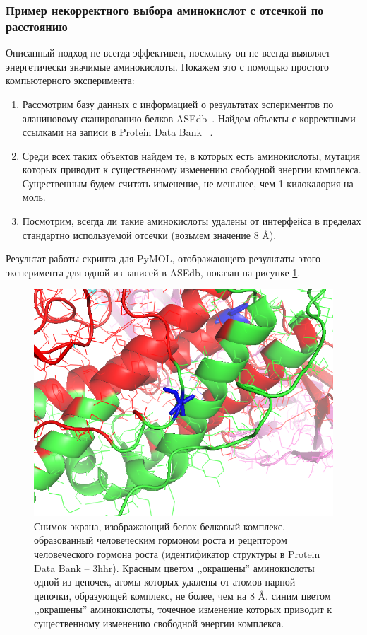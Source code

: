 \subsubsection{Пример некорректного выбора аминокислот с отсечкой по расстоянию}
Описанный подход не всегда эффективен, поскольку он не всегда выявляет энергетически значимые аминокислоты. Покажем это с помощью простого компьютерного эксперимента:
\begin{enumerate}
\item Рассмотрим базу данных с информацией о результатах эспериментов по аланиновому сканированию белков ASEdb~\cite{asedb2001}. Найдем объекты с корректными ссылками на записи в Protein Data Bank ~\cite{rcsb}.
\item Среди всех таких объектов найдем те, в которых есть аминокислоты, мутация которых приводит к существенному изменению свободной энергии комплекса. Существенным будем считать изменение, не меньшее, чем 1 килокалория на моль.
\item Посмотрим, всегда ли такие аминокислоты удалены от интерфейса в пределах стандартно используемой отсечки (возьмем значение 8 \AA{}).
\end{enumerate}

Результат работы скрипта для PyMOL, отображающего результаты этого эксперимента для одной из записей в ASEdb, показан на  рисунке \ref{fig:image7}.


\begin{figure}
\includegraphics[width=\linewidth]{image7.png}

\caption{\small{Снимок экрана, изображающий
белок-белковый комплекс, образованный  человеческим гормоном роста и рецептором человеческого гормона роста (идентификатор структуры в Protein Data Bank -- 3hhr). Красным цветом ,,окрашены'' аминокислоты одной из цепочек, атомы которых удалены от атомов парной цепочки, образующей  комплекс, не более, чем на 8 \AA{}. синим цветом ,,окрашены'' аминокислоты, точечное изменение которых приводит к существенному изменению свободной энергии комплекса.  }}
\label{fig:image7}
\end{figure}

